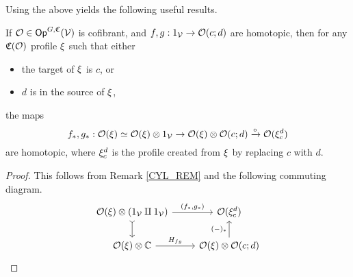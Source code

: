 \documentclass[a4paper,10pt
,draft
]{article}%
\renewcommand{\1}{\eta}%
\begin{document}
% 







Using the above yields the following useful results.

\begin{lemma}
      \label{HTPIC_COMP_LEM}
      If $\mathcal{O} \in \mathsf{Op}^{G, \mathfrak C}(\mathcal V)$ is cofibrant,
      and $f,g: 1_{\mathcal V} \to \mathcal{O}(c;d)$ are homotopic, then for any $\mathfrak C(\mathcal{O})$ profile $\xi$ such that either
      \begin{itemize} %
      \item the target of $\xi$ is $c$, or
      \item $d$ is in the source of $\xi$,
      \end{itemize}
      the maps
      \begin{equation}
            f_{\**}, g_{\**}: \O(\ksi) \simeq \O(\ksi) \otimes 1_\V \to \O(\ksi) \otimes \O(c;d) \xrightarrow{\circ} \O(\ksi_c^d)
      \end{equation}
      are homotopic,
      where $\xi_c^d$ is the profile created from $\xi$ by replacing $c$ with $d$.
\end{lemma}
\begin{proof}
      This follows from Remark \ref{CYL_REM} and the following commuting diagram.
      \begin{equation}
            \begin{tikzcd}
                  \O(\ksi) \otimes (1_\V \amalg 1_\V) \arrow[r, "{(f_{\**}, g_{\**})}"] \arrow[d, tail]
                  &
                  \O(\ksi_c^d)
                  \\
                  \O(\ksi) \otimes \mathbb C \arrow[r, "H_{fg}"]
                  &
                  \O(\ksi) \otimes \O(c;d) \arrow[u, "{(-)_{\**}}"]
            \end{tikzcd}
      \end{equation}
\end{proof}
\end{document}
